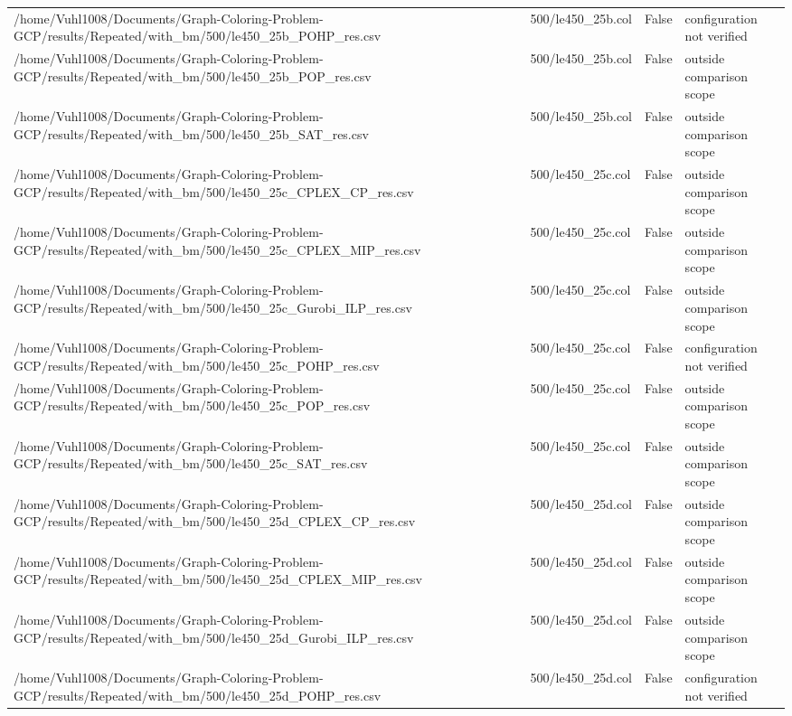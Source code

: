 \begin{table}[htbp]
\begin{tabular}{llll}
/home/Vuhl1008/Documents/Graph-Coloring-Problem-GCP/results/Repeated/with\_bm/500/le450\_25b\_POHP\_res.csv & 500/le450\_25b.col & False & configuration not verified \\
/home/Vuhl1008/Documents/Graph-Coloring-Problem-GCP/results/Repeated/with\_bm/500/le450\_25b\_POP\_res.csv & 500/le450\_25b.col & False & outside comparison scope \\
/home/Vuhl1008/Documents/Graph-Coloring-Problem-GCP/results/Repeated/with\_bm/500/le450\_25b\_SAT\_res.csv & 500/le450\_25b.col & False & outside comparison scope \\
/home/Vuhl1008/Documents/Graph-Coloring-Problem-GCP/results/Repeated/with\_bm/500/le450\_25c\_CPLEX\_CP\_res.csv & 500/le450\_25c.col & False & outside comparison scope \\
/home/Vuhl1008/Documents/Graph-Coloring-Problem-GCP/results/Repeated/with\_bm/500/le450\_25c\_CPLEX\_MIP\_res.csv & 500/le450\_25c.col & False & outside comparison scope \\
/home/Vuhl1008/Documents/Graph-Coloring-Problem-GCP/results/Repeated/with\_bm/500/le450\_25c\_Gurobi\_ILP\_res.csv & 500/le450\_25c.col & False & outside comparison scope \\
/home/Vuhl1008/Documents/Graph-Coloring-Problem-GCP/results/Repeated/with\_bm/500/le450\_25c\_POHP\_res.csv & 500/le450\_25c.col & False & configuration not verified \\
/home/Vuhl1008/Documents/Graph-Coloring-Problem-GCP/results/Repeated/with\_bm/500/le450\_25c\_POP\_res.csv & 500/le450\_25c.col & False & outside comparison scope \\
/home/Vuhl1008/Documents/Graph-Coloring-Problem-GCP/results/Repeated/with\_bm/500/le450\_25c\_SAT\_res.csv & 500/le450\_25c.col & False & outside comparison scope \\
/home/Vuhl1008/Documents/Graph-Coloring-Problem-GCP/results/Repeated/with\_bm/500/le450\_25d\_CPLEX\_CP\_res.csv & 500/le450\_25d.col & False & outside comparison scope \\
/home/Vuhl1008/Documents/Graph-Coloring-Problem-GCP/results/Repeated/with\_bm/500/le450\_25d\_CPLEX\_MIP\_res.csv & 500/le450\_25d.col & False & outside comparison scope \\
/home/Vuhl1008/Documents/Graph-Coloring-Problem-GCP/results/Repeated/with\_bm/500/le450\_25d\_Gurobi\_ILP\_res.csv & 500/le450\_25d.col & False & outside comparison scope \\
/home/Vuhl1008/Documents/Graph-Coloring-Problem-GCP/results/Repeated/with\_bm/500/le450\_25d\_POHP\_res.csv & 500/le450\_25d.col & False & configuration not verified \\

\end{tabular}
\end{table}
